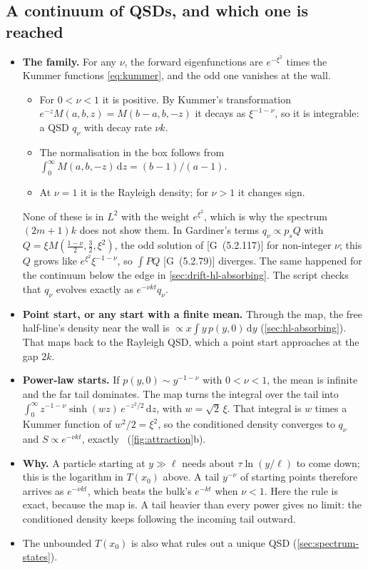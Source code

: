 \documentclass[11pt]{article}
\numberwithin{equation}{section}
\newcommand{\dd}{\mathrm{d}}
\newcommand{\G}[1]{[G~(#1)]}
\begin{document}
\subsection{A continuum of QSDs, and which one is reached}

\begin{itemize}
  \item \textbf{The family.} For any $\nu$, the forward eigenfunctions are $e^{-\xi^2}$ times the Kummer
        functions \cref{eq:kummer}, and the odd one vanishes at the wall.
        \begin{itemize}
          \item For $0<\nu<1$ it is positive. By Kummer's transformation $e^{-z}M(a,b,z)=M(b-a,b,-z)$ it
                decays as $\xi^{-1-\nu}$, so it is integrable: a QSD $q_\nu$ with decay rate $\nu k$.
          \item The normalisation in the box follows from $\int_0^\infty M(a,b,-z)\,\dd z=(b-1)/(a-1)$.
          \item At $\nu=1$ it is the Rayleigh density; for $\nu>1$ it changes sign.
        \end{itemize}
        None of these is in $L^2$ with the weight $e^{\xi^2}$, which is why the spectrum $(2m+1)k$ does not show
        them. In Gardiner's terms $q_\nu\propto p_sQ$ with $Q=\xi M(\frac{1-\nu}2,\frac32,\xi^2)$, the odd solution of
        \G{5.2.117} for non-integer $\nu$; this $Q$ grows like $e^{\xi^2}\xi^{-1-\nu}$, so $\int P Q$ \G{5.2.79}
        diverges. The same happened for the continuum below the edge in \cref{sec:drift-hl-absorbing}. The script
        checks that $q_\nu$ evolves exactly as $e^{-\nu kt}q_\nu$.
  \item \textbf{Point start, or any start with a finite mean.} Through the map, the free half-line's density
        near the wall is $\propto x\int y\,p(y,0)\,\dd y$ (\cref{sec:hl-absorbing}). That maps back to the
        Rayleigh QSD, which a point start approaches at the gap $2k$.
  \item \textbf{Power-law starts.} If $p(y,0)\sim y^{-1-\nu}$ with $0<\nu<1$, the mean is infinite and the far
        tail dominates. The map turns the integral over the tail into
        $\int_0^\infty z^{-1-\nu}\sinh(wz)\,e^{-z^2/2}\,\dd z$, with $w=\sqrt2\,\xi$. That integral is $w$ times
        a Kummer function of $w^2/2=\xi^2$, so the conditioned density converges to $q_\nu$ and
        $S\propto e^{-\nu kt}$, exactly~\cite{lladser} (\cref{fig:attraction}b).
  \item \textbf{Why.} A particle starting at $y\gg\ell$ needs about $\tau\ln(y/\ell)$ to come down; this is the
        logarithm in $T(x_0)$ above. A tail $y^{-\nu}$ of starting points therefore arrives as $e^{-\nu kt}$,
        which beats the bulk's $e^{-kt}$ when $\nu<1$. Here the rule is exact, because the map is. A tail heavier
        than every power gives no limit: the conditioned density keeps following the incoming tail outward.
  \item The unbounded $T(x_0)$ is also what rules out a unique QSD (\cref{sec:spectrum-states}).
\end{itemize}
\end{document}
